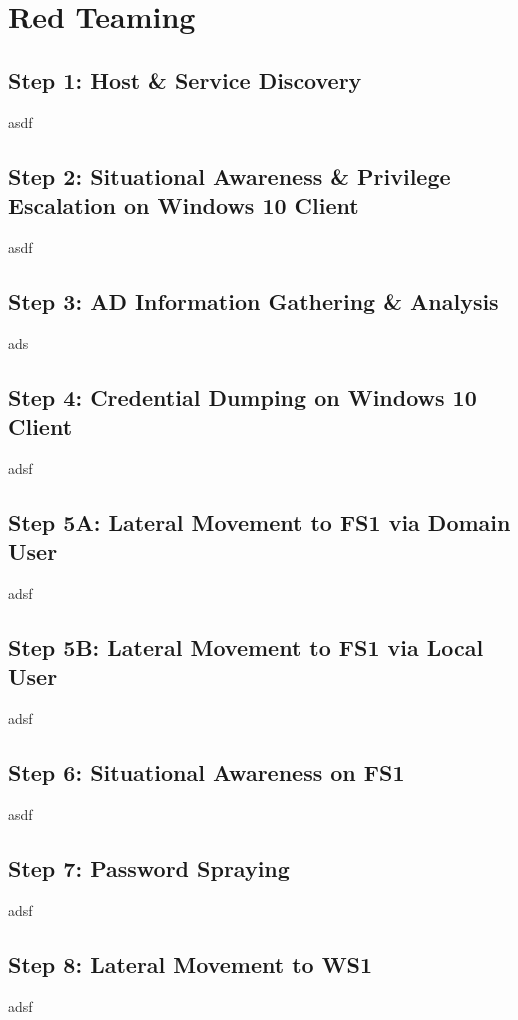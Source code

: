 

\section{Red Teaming}

\subsection{Step 1: Host \& Service Discovery}
asdf

\subsection{Step 2: Situational Awareness \& Privilege Escalation on Windows 10 Client}
asdf

\subsection{Step 3: AD Information Gathering \& Analysis}
ads

\subsection{Step 4: Credential Dumping on Windows 10 Client}
adsf

\subsection{Step 5A: Lateral Movement to FS1 via Domain User}
adsf

\subsection{Step 5B: Lateral Movement to FS1 via Local User}
adsf

\subsection{Step 6: Situational Awareness on FS1}
asdf

\subsection{Step 7: Password Spraying}
adsf

\subsection{Step 8: Lateral Movement to WS1}
adsf

